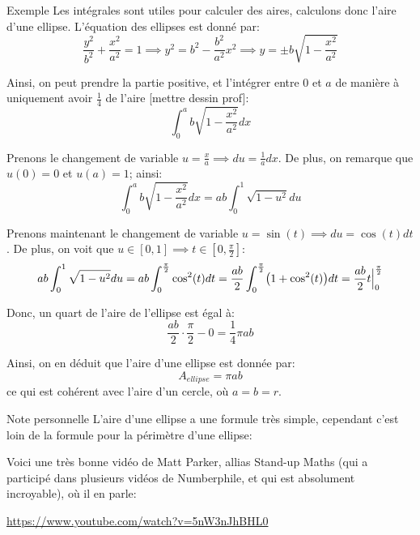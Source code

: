 \documentclass[a4paper]{article}
\begin{document}
\begin{parag}{Exemple}
    Les intégrales sont utiles pour calculer des aires, calculons donc l'aire d'une ellipse. L'équation des ellipses est donné par:
    \[\frac{y^2}{b^2} + \frac{x^2}{a^2} = 1 \implies y^2 = b^2 - \frac{b^2}{a^2} x^2 \implies y = \pm b\sqrt{1 - \frac{x^2}{a^2}}\]

    Ainsi, on peut prendre la partie positive, et l'intégrer entre $0$ et $a$ de manière à uniquement avoir $\frac{1}{4}$ de l'aire [mettre dessin prof]:
    \[\int_{0}^{a} b\sqrt{1 - \frac{x^2}{a^2}}dx\]
    

    Prenons le changement de variable $u = \frac{x}{a} \implies du = \frac{1}{a} dx$. De plus, on remarque que $u\left(0\right) = 0$ et $u\left(a\right)= 1$; ainsi:
    \[\int_{0}^{a} b\sqrt{1 - \frac{x^2}{a^2}}dx = ab \int_{0}^{1} \sqrt{1 - u^2}du\]

    Prenons maintenant le changement de variable $u = \sin\left(t\right) \implies du = \cos\left(t\right)dt$. De plus, on voit que $u \in \left[0, 1\right] \implies t \in \left[0, \frac{\pi}{2}\right]$:
    \[ab \int_{0}^{1} \sqrt{1 - u^2}du = ab \int_{0}^{\frac{\pi}{2}}  \cos^2\left(t\right)dt = \frac{ab}{2} \int_{0}^{\frac{\pi}{2}} \left(1 + \cos^2\left(t\right)\right) dt = \frac{ab}{2} t \eval_{0}^{\frac{\pi}{2}} \]

    Donc, un quart de l'aire de l'ellipse est égal à: 
    \[\frac{ab}{2} \cdot \frac{\pi}{2} - 0 = \frac{1}{4}\pi ab\]
    
    Ainsi, on en déduit que l'aire d'une ellipse est donnée par: 
    \[A_{ellipse} = \pi ab\]
    ce qui est cohérent avec l'aire d'un cercle, où $a = b = r$.

    \begin{subparag}{Note personnelle}
        L'aire d'une ellipse a une formule très simple, cependant c'est loin de la formule pour la périmètre d'une ellipse:

        Voici une très bonne vidéo de Matt Parker, allias Stand-up Maths (qui a participé dans plusieurs vidéos de Numberphile, et qui est absolument incroyable), où il en parle: 
        \begin{center}
            \url{https://www.youtube.com/watch?v=5nW3nJhBHL0}
        \end{center}
    \end{subparag}
    
\end{parag}
\end{document}
